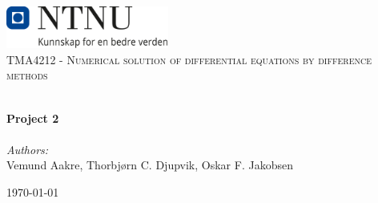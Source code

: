 
\begin{titlepage}
\vbox{ }
\vbox{ }
\begin{center}
\includegraphics[width=0.40\textwidth]{Images/NTNU_logo.png}\\[1cm]
\textsc{\Large TMA4212 - Numerical solution of differential equations by difference methods}\\[0.5cm]
\vbox{ }

\HRule \\[0.4cm]
{ \huge \bfseries Project 2}\\[0.4cm]
\HRule \\[1.5cm]

\large
\emph{Authors:}\\
Vemund Aakre, Thorbjørn C. Djupvik, Oskar F. Jakobsen
\vfill

{\large \today}
\end{center}
\end{titlepage}

